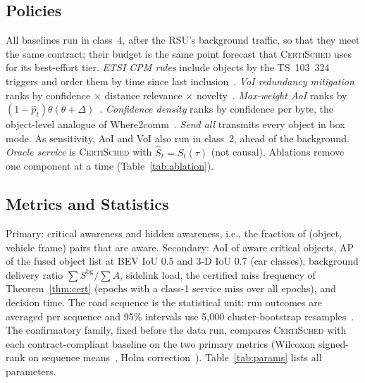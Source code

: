 \documentclass[journal]{IEEEtran}
\theoremstyle{remark}
\newcommand{\cs}{\textsc{CertiSched}}
\begin{document}
\subsection{Policies}
All baselines run in class~4, after the RSU's background traffic, so that they meet the same contract; their budget is the same point forecast that \cs{} uses for its best-effort tier. \emph{ETSI CPM rules} include objects by the TS~103~324 triggers and order them by time since last inclusion~\cite{etsi103324}. \emph{VoI redundancy mitigation} ranks by confidence $\times$ distance relevance $\times$ novelty~\cite{lyu2025voi}. \emph{Max-weight AoI} ranks by $(1-\hat p_t)\theta(\theta+\Delta)$~\cite{kadota2018}. \emph{Confidence density} ranks by confidence per byte, the object-level analogue of Where2comm~\cite{where2comm}. \emph{Send all} transmits every object in box mode. As sensitivity, AoI and VoI also run in class~2, ahead of the background. \emph{Oracle service} is \cs{} with $\hat S_t=S_t(\tau)$ (not causal). Ablations remove one component at a time (Table~\ref{tab:ablation}).

\subsection{Metrics and Statistics}
Primary: critical awareness and hidden awareness, i.e., the fraction of (object, vehicle frame) pairs that are aware. Secondary: AoI of aware critical objects, AP of the fused object list at BEV IoU 0.5 and 3-D IoU 0.7 (car classes), background delivery ratio $\sum S^{\mathrm{bg}}/\sum A$, sidelink load, the certified miss frequency of Theorem~\ref{thm:cert} (epochs with a class-1 service miss over all epochs), and decision time. The road sequence is the statistical unit: run outcomes are averaged per sequence and 95\% intervals use 5,000 cluster-bootstrap resamples~\cite{cameron2008}. The confirmatory family, fixed before the data run, compares \cs{} with each contract-compliant baseline on the two primary metrics (Wilcoxon signed-rank on sequence means~\cite{wilcoxon1945}, Holm correction~\cite{holm1979}). Table~\ref{tab:params} lists all parameters.
\end{document}
